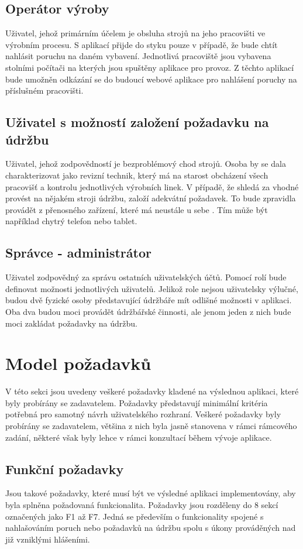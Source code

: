 \documentclass[thesis=M,czech]{FITthesis}[2012/06/26]
\begin{document}
\subsection{Operátor výroby}
\label{ssec:operator_vyroby}
Uživatel, jehož primárním účelem je obsluha strojů na jeho pracovišti ve výrobním procesu. S aplikací přijde do styku pouze v případě, že bude chtít nahlásit poruchu na daném vybavení. Jednotlivá pracoviště jsou vybavena stolními počítači na kterých jsou spuštěny aplikace pro provoz. Z těchto aplikací bude umožněn odkázání se do budoucí webové aplikace pro nahlášení poruchy na příslušném pracovišti.
\subsection{Uživatel s možností založení požadavku na údržbu}
\label{ssec:pozadavek_udrzba}
Uživatel, jehož zodpovědností je bezproblémový chod strojů. Osoba by se dala charakterizovat jako revizní technik, který má na starost obcházení všech pracovišť a kontrolu jednotlivých výrobních linek. V případě, že shledá za vhodné provést na nějakém stroji údržbu, založí adekvátní požadavek. To bude zpravidla provádět z přenosného zařízení, které má neustále u sebe . Tím může být například chytrý telefon nebo tablet.
\subsection{Správce - administrátor}
\label{ssec:administrator}
Uživatel zodpovědný za správu ostatních uživatelských účtů. Pomocí rolí bude definovat možnosti jednotlivých uživatelů. Jelikož role nejsou uživatelsky výlučné, budou dvě fyzické osoby představující údržbáře mít odlišné možnosti v aplikaci. Oba dva budou moci provádět údržbářské činnosti, ale jenom jeden z nich bude moci zakládat požadavky na údržbu.


\section{Model požadavků}
V této sekci jsou uvedeny veškeré požadavky kladené na výslednou aplikaci, které byly probírány se zadavatelem. Požadavky představují minimální kritéria potřebná pro samotný návrh uživatelského rozhraní. Veškeré požadavky byly probírány se zadavatelem, většina z nich byla jasně stanovena v rámci rámcového zadání, některé však byly lehce v rámci konzultací během vývoje aplikace.

\subsection{Funkční požadavky}
Jsou takové požadavky, které musí být ve výsledné aplikaci implementovány, aby byla splněna požadovaná funkcionalita. Požadavky jsou rozděleny do 8 sekcí označených jako F1 až F7. Jedná se především o funkcionality spojené s nahlašováním poruch nebo požadavků na údržbu spolu s úkony prováděných nad již vzniklými hlášeními. 
\end{document}
